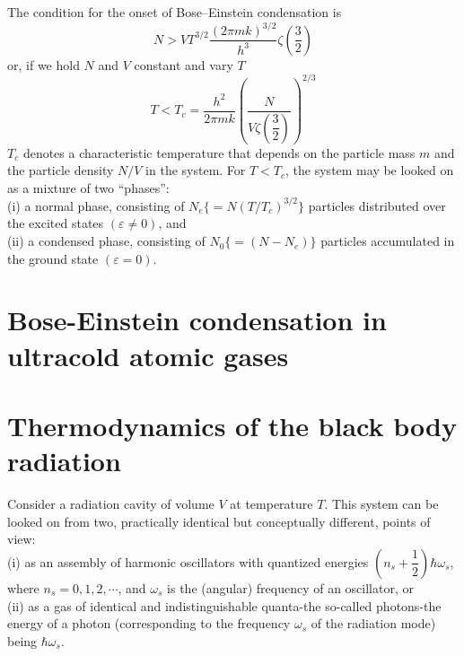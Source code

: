 \documentclass[12pt,a4paper]{article}
\begin{document}
The condition for the onset of Bose–Einstein condensation is
\begin{equation}
N > VT^{3/2}\frac{(2\pi mk)^{3/2}}{h^3} \zeta\left(\frac{3}{2}\right) 
\end{equation}
or, if we hold $N$ and $V$ constant and vary $T$
\begin{equation}
T < T_c = \dfrac{h^2}{2\pi mk} \left(\frac{N}{V\zeta\left(\dfrac{3}{2}\right) } \right)^{2/3}
\end{equation}
$T_c$ denotes a characteristic temperature that depends on the particle mass $m$ and the particle density $N/V$ in the system. For $T < T_c$, the system may be looked on as a mixture of two “phases”: \\
(i) a normal phase, consisting of $N_e \{= N(T/T_c)^{3/2}\}$ particles distributed over the excited states $(\varepsilon \neq 0)$, and \\
(ii) a condensed phase, consisting of $N_0 \{=(N-N_e)\}$ particles accumulated in the ground state $(\varepsilon = 0)$.



\section{Bose-Einstein condensation in ultracold atomic gases}



\section{Thermodynamics of the black body radiation}
Consider a radiation cavity of volume $V$ at temperature $T$. This system can be looked on from two, practically identical but conceptually different, points of view: \\
(i) as an assembly of harmonic oscillators with quantized energies $(n_s+\dfrac{1}{2})\hbar \omega_s$, where
$n_s = 0, 1, 2, \cdots$, and $\omega_s$ is the (angular) frequency of an oscillator, or \\
(ii) as a gas of identical and indistinguishable quanta-the so-called photons-the energy of a photon (corresponding to the frequency $\omega_s$ of the radiation mode) being $\hbar \omega_s$.
\end{document}

